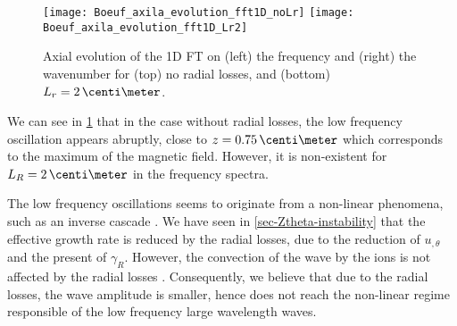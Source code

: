 \begin{figure}[!hbt]
  \centering
  \texttt{[image: Boeuf\_axila\_evolution\_fft1D\_noLr]}
  \texttt{[image: Boeuf\_axila\_evolution\_fft1D\_Lr2]}
  \caption{Axial evolution of the \ac{1D} \ac{FT} on (left) the frequency and (right) the wavenumber for (top) no radial losses, and (bottom) $L_r=2\,\centi\meter$. }
  \label{fig-axial_fft1D}
\end{figure}

We can see in \cref{fig-axial_fft1D} that in the case without radial losses, the low frequency oscillation appears abruptly, close to $z=0.75\,\centi\meter$ which corresponds to the maximum of the magnetic field.
However, it is non-existent for $L_R=2\,\centi\meter$ in the frequency spectra.


The low frequency oscillations seems to originate from a non-linear phenomena, such as an inverse cascade \citep{taccogna2019}.
We have seen in \cref{sec-Ztheta-instability} that the effective growth rate is reduced by the radial losses, due to the reduction of $u_{, \theta}$ and the present of $\gamma_R$.
However, the convection of the wave by the ions is not affected by the radial losses \citep{martorelli2019}.
Consequently, we believe that due to the radial losses, the wave amplitude is smaller, hence does not reach the non-linear regime responsible of the low frequency large wavelength waves.

% 
% 

\FloatBarrier
